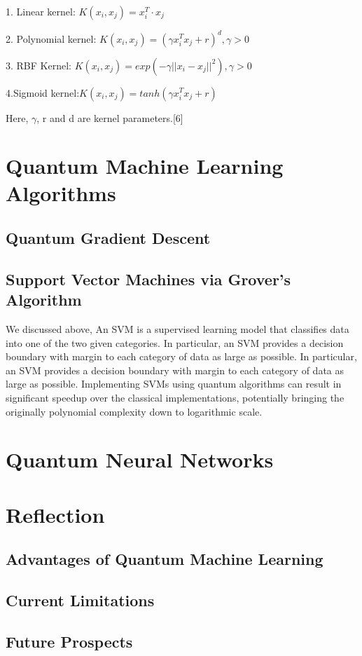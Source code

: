 \documentclass[hidelinks,12pt]{article}
\begin{document}
	1. Linear kernel: $K (x_i , x_j) = x_i^T\cdot x_j$ 

	2. Polynomial kernel: $K (x_i , x_j) = (\gamma x_i^T x_j + r)^d , \gamma > 0$ 

	3. RBF Kernel: $ K (x_i , x_j) = exp(-\gamma ||x_i - x_j||^2) , \gamma > 0$

	4.Sigmoid kernel:$ K (x_i , x_j) = tanh(\gamma x_i^T x_j + r)$  

	Here, $\gamma$, r and d are kernel parameters.[6]

\newpage
\section{Quantum Machine Learning Algorithms}
\subsection{Quantum Gradient Descent}
\subsection{Support Vector Machines via Grover's Algorithm}
We discussed above, An SVM is a supervised learning model that classifies data into one of the two given categories. In particular, an SVM provides a decision boundary with margin to each category of data as large as possible. In particular, an SVM provides a decision boundary with margin to each
category of data as large as possible. Implementing SVMs using quantum algorithms can result in significant speedup over the classical implementations, potentially bringing the originally polynomial complexity down
to logarithmic scale.
\newpage
\section{Quantum Neural Networks}
\newpage
\section{Reflection}
\subsection{Advantages of Quantum Machine Learning}
\subsection{Current Limitations}
\subsection{Future Prospects}
\newpage
\end{document}
